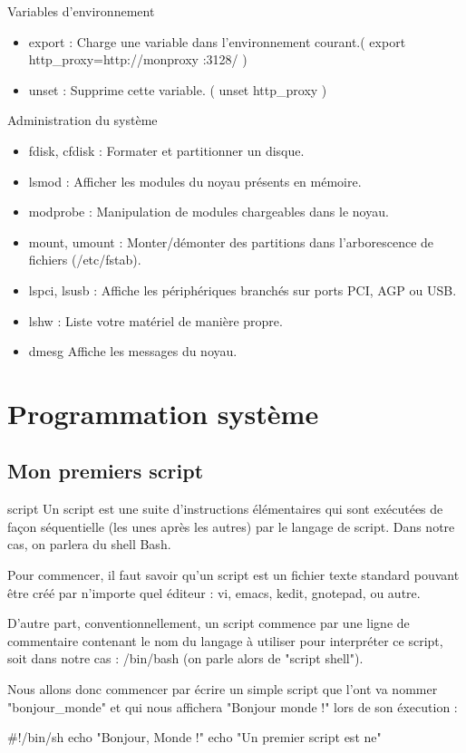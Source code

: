 \documentclass[10pt]{beamer}
\begin{document}
\begin{frame}{Variables d'environnement}
\begin{itemize}
\item \alert{export} : Charge une variable dans l'environnement courant.( export http\_proxy=http://monproxy :3128/ )
\item \alert{unset} : Supprime cette variable. ( unset http\_proxy )
\end{itemize}
\end{frame}

\begin{frame}{Administration du système}
\begin{itemize}
\item \alert{fdisk}, \alert{cfdisk} : Formater et partitionner un disque.
\item \alert{lsmod} : Afficher les modules du noyau présents en mémoire.
\item \alert{modprobe} : Manipulation de modules chargeables dans le noyau.
\item \alert{mount}, \alert{umount} : Monter/démonter des partitions dans l'arborescence de fichiers (/etc/fstab).
\item \alert{lspci}, \alert{lsusb} : Affiche les périphériques branchés sur ports PCI, AGP ou USB.
\item \alert{lshw} : Liste votre matériel de manière propre.
\item \alert{dmesg} Affiche les messages du noyau.
\end{itemize}
\end{frame}

\section{Programmation système}
\subsection{Mon premiers script}
\begin{frame}[fragile]{script}
Un script est une suite d'instructions élémentaires qui sont exécutées de façon séquentielle (les unes après les autres) par le langage de script. Dans notre cas, on parlera du shell Bash.
\pause 


Pour commencer, il faut savoir qu'un script est un \alert{fichier texte} standard pouvant être créé par n'importe quel éditeur : vi, emacs, kedit, gnotepad, ou autre. 

D'autre part, conventionnellement, un script commence par une ligne de commentaire contenant le nom du langage à utiliser pour interpréter ce script, soit dans notre
cas : /bin/bash (on parle alors de "script shell").

Nous allons donc commencer par écrire un simple script que l'ont va nommer
"bonjour\_monde" et qui nous affichera "Bonjour monde !" lors de son éxecution :

\begin{mylisting}
#!/bin/sh
echo "Bonjour, Monde !"
echo "Un premier script est ne"
\end{mylisting}

\end{frame}
\end{document}
